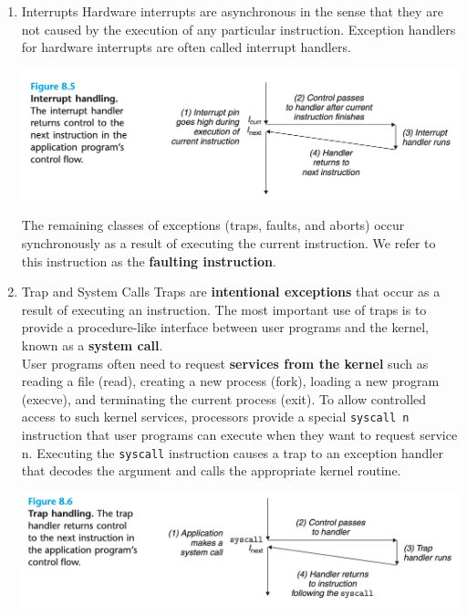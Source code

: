 \documentclass[11pt]{article}
\begin{document}
\begin{enumerate}
\item Interrupts
\label{sec:orge0ffc19}
Hardware interrupts are asynchronous in the sense that they are not caused by the execution of any particular instruction. Exception handlers for hardware interrupts are often called interrupt handlers.\\

\begin{center}
\includegraphics[width=.9\linewidth]{pics/figure8.5-interrupt-handling.png}
\end{center}


The remaining classes of exceptions (traps, faults, and aborts) occur synchronously as a result of executing the current instruction. We refer to this instruction as the \textbf{faulting instruction}.\\

\item Trap and System Calls
\label{sec:org24297ab}
Traps are \textbf{intentional exceptions} that occur as a result of executing an instruction. The most important use of traps is to provide a procedure-like interface between user programs and the kernel, known as a \textbf{system call}.\\

User programs often need to request \textbf{services from the kernel} such as reading a file (read), creating a new process (fork), loading a new program (execve), and terminating the current process (exit). To allow controlled access to such kernel services, processors provide a special \texttt{syscall n} instruction that user programs can execute when they want to request service n. Executing the \texttt{syscall} instruction causes a trap to an exception handler that decodes the argument and calls the appropriate kernel routine.\\

\begin{center}
\includegraphics[width=.9\linewidth]{pics/figure8.6-trap-handling.png}
\end{center}


\end{enumerate}
\end{document}
